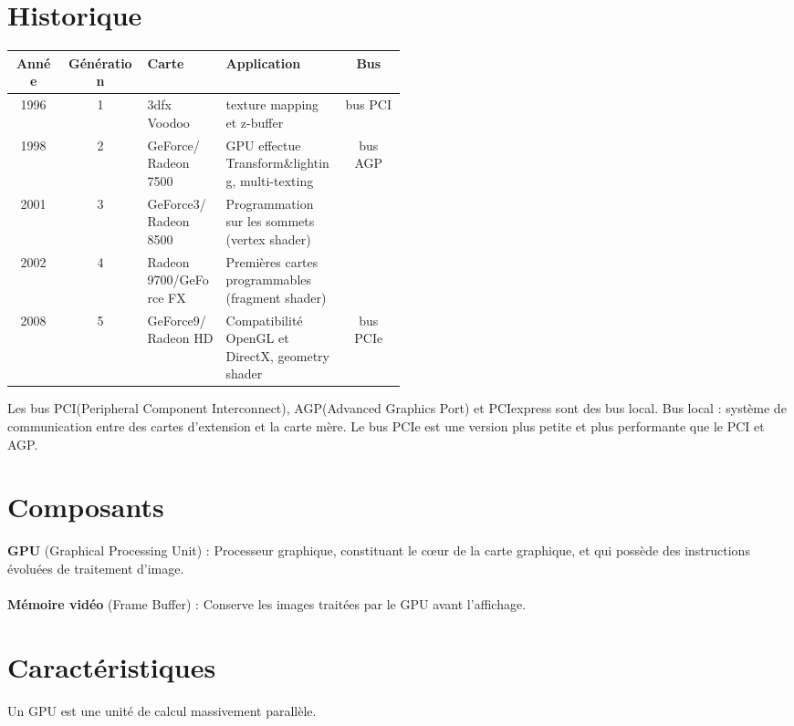 \section{Historique}
\begin{center}
\begin{tabular}{|c|c|m{0.2\linewidth}|m{0.3\linewidth} |c|}
\hline
Année & Génération & Carte & Application & Bus \\
\hline
1996 & 1 & 3dfx Voodoo & texture mapping et z-buffer & bus PCI\\
\hline
1998 & 2 & GeForce/ Radeon 7500 & GPU effectue Transform\&lighting, multi-texting & bus AGP \\
\cline{1-4}
2001 & 3 & GeForce3/ Radeon 8500 & Programmation sur les sommets (vertex shader)	& \\
\cline{1-4}
2002 & 4 & Radeon 9700/GeForce FX & Premières cartes programmables (fragment shader)	& \\
\hline
2008 & 5 & GeForce9/ Radeon HD & Compatibilité OpenGL et DirectX,  geometry shader & bus PCIe \\
\hline
\end{tabular}
\end{center}

Les bus PCI(Peripheral Component Interconnect), AGP(Advanced Graphics Port) et  PCIexpress sont des bus local.
Bus local : système de communication entre des cartes d’extension et la carte mère.
Le bus PCIe est une version plus petite et plus performante que le PCI et AGP.

\section{Composants}
\textbf{GPU} (Graphical Processing Unit) : Processeur graphique, constituant le cœur de la carte graphique, et qui possède des instructions évoluées de traitement d’image. \\\\
\textbf{Mémoire vidéo} (Frame Buffer) : Conserve les images traitées par le GPU avant l’affichage.

\section{Caractéristiques}
Un GPU est une unité de calcul massivement parallèle.
